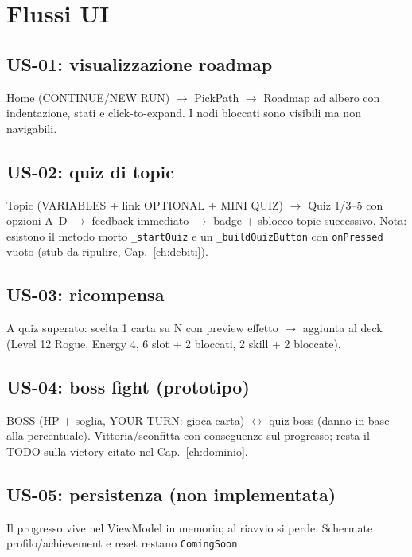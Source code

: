 \chapter{Flussi UI}
\label{ch:flussi}

\section{US-01: visualizzazione roadmap}
Home (CONTINUE/NEW RUN) $\rightarrow$ PickPath $\rightarrow$ Roadmap ad
albero con indentazione, stati e click-to-expand. I nodi bloccati sono
visibili ma non navigabili.

\section{US-02: quiz di topic}
Topic (VARIABLES + link OPTIONAL + MINI QUIZ) $\rightarrow$ Quiz 1/3--5
con opzioni A--D $\rightarrow$ feedback immediato $\rightarrow$ badge +
sblocco topic successivo. Nota: esistono il metodo morto \texttt{\_startQuiz}
e un \texttt{\_buildQuizButton} con \texttt{onPressed} vuoto (stub da
ripulire, Cap.~\ref{ch:debiti}).

\section{US-03: ricompensa}
A quiz superato: scelta 1 carta su N con preview effetto $\rightarrow$
aggiunta al deck (Level 12 Rogue, Energy 4, 6 slot + 2 bloccati, 2 skill
+ 2 bloccate).

\section{US-04: boss fight (prototipo)}
BOSS (HP + soglia, YOUR TURN: gioca carta) $\leftrightarrow$ quiz boss
(danno in base alla percentuale). Vittoria/sconfitta con conseguenze sul
progresso; resta il TODO sulla victory citato nel Cap.~\ref{ch:dominio}.

\section{US-05: persistenza (non implementata)}
Il progresso vive nel ViewModel in memoria; al riavvio si perde. Schermate
profilo/achievement e reset restano \texttt{ComingSoon}.
